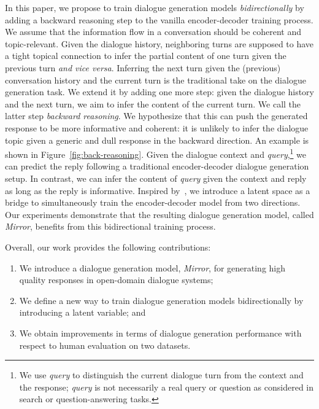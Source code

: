 \documentclass[sigconf]{acmart}
\begin{document}
In this paper, we propose to train dialogue generation models \emph{bidirectionally} by adding a backward reasoning step to the vanilla encoder-decoder training process. 
We assume that the information flow in a conversation should be coherent and topic-relevant. Given the dialogue history, neighboring turns are supposed to have a tight topical connection to infer the partial content of one turn given the previous turn \emph{and vice versa}. 
Inferring the next turn given the (previous) conversation history and the current turn is the traditional take on the dialogue generation task. 
We extend it by adding one more step: given the dialogue history and the next turn, we aim to infer the content of the current turn. We call the latter step \emph{backward reasoning}. We hypothesize that this can push the generated response to be more informative and coherent: it is unlikely to infer the dialogue topic given a generic and dull response in the backward direction. 
An example is shown in Figure~\ref{fig:back-reasoning}. Given the dialogue context and \emph{query},\footnote{We use \emph{query} to distinguish the current dialogue turn from the context and the response; \emph{query} is not necessarily a real query or question as considered in search or question-answering tasks.} we can predict the reply following a traditional encoder-decoder dialogue generation setup. In contrast, we can infer the content of \emph{query} given the context and reply as long as the reply is informative. 
Inspired by~\citet{zheng2019mirror}, we introduce a latent space as a bridge to simultaneously train the encoder-decoder model from two directions. 
Our experiments demonstrate that the resulting dialogue generation model, called \emph{Mirror}, benefits from this bidirectional training process.

Overall, our work provides the following contributions:
\begin{enumerate}[leftmargin=*,label=\textbf{C\arabic*},nosep]

\item We introduce a dialogue generation model, \emph{Mirror}, for generating high quality responses in open-domain dialogue systems;

\item We define a new way to train dialogue generation models bidirectionally by introducing a latent variable; and

\item We obtain improvements in terms of dialogue generation performance with respect to human evaluation on two datasets.
\end{enumerate}
\end{document}
